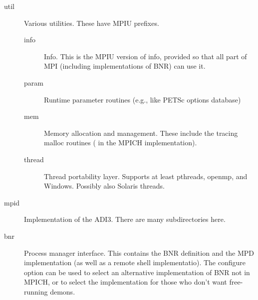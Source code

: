 \documentclass{article}
\begin{document}
\begin{description}
\begin{description}
  \item[util]Various utilities.  These have MPIU prefixes.
    \begin{description}
    \item[info]Info.  This is the MPIU version of info, provided so
    that all part of MPI (including implementations of BNR) can use it.
    \item[param]Runtime parameter routines (e.g., like PETSc options database)
    \item[mem]Memory allocation and management.  These include the tracing
      malloc routines ( in the MPICH implementation).
    \item[thread]Thread portability layer.  Supports at least pthreads,
      openmp, and Windows.  Possibly also Solaris threads.
    \end{description}
  \item[mpid]Implementation of the ADI3.  There are many subdirectories here.
  \item[bnr]Process manager interface.  This contains the BNR
      definition and the MPD implementation (as well as a remote shell
      implementatio).  The configure option
       can be used to select an alternative
      implementation of BNR not in MPICH, or to select the
       implementation for those who don't want
      free-running demons.


\end{description}
\end{description}
\end{document}
